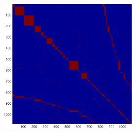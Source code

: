 \documentclass{article} %
\begin{document}
\begin{figure}
\begin{subfigure}[c]{\textwidth}
\begin{subfigure}[]{0.195\textwidth}
			\label{fig:4_1_s_su}
		\end{subfigure}
		\begin{subfigure}[c]{0.195\textwidth}
			\includegraphics[width = \textwidth]{./img/adj4_1_s.pdf}
			\label{fig4_1_s_adj}
		\end{subfigure}
	\end{subfigure}
	

\end{figure}
\end{document}
